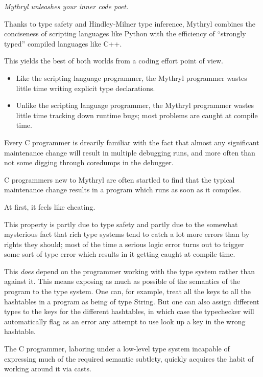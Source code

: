 {\it Mythryl unleashes your inner code poet.}

Thanks to type safety and Hindley-Milner type inference, Mythryl combines the conciseness 
of scripting languages like Python with the efficiency of ``strongly typed'' compiled 
languages like C++.

This yields the best of both worlds from a coding effort point of view. 

\begin{itemize}

\item Like the scripting language programmer, the Mythryl programmer wastes little 
time writing explicit type declarations.

\item Unlike the scripting language programmer, 
the Mythryl programmer wastes little time tracking down runtime bugs; most problems are 
caught at compile time.

\end{itemize}

Every C programmer is drearily familiar with the fact that almost any 
significant maintenance change will result in multiple debugging runs, and more 
often than not some digging through coredumps in the debugger. 

C programmers new to Mythryl are often startled to find that the 
typical maintenance change results in a program which runs as 
soon as it compiles.

At first, it feels like cheating.

This property is partly due to type safety and partly due to the somewhat 
mysterious fact that rich type systems tend to catch a lot more errors 
than by rights they should;  most of the time a serious logic error 
turns out to trigger some sort of type error which results in it getting 
caught at compile time.

This {\em does} depend on the programmer working with the type system 
rather than against it.  This means exposing as much as possible of 
the semantics of the program to the type system. 
One can, for example, 
treat all the keys to all the hashtables in a program as being of type 
String.
But one can also assign different types to the keys for the 
different hashtables, in which case the typechecker will automatically 
flag as an error any attempt to use look up a key in the wrong hashtable. 

The C programmer, laboring under a low-level type system incapable of 
expressing much of the required semantic subtlety, quickly acquires the 
habit of working around it via casts.


